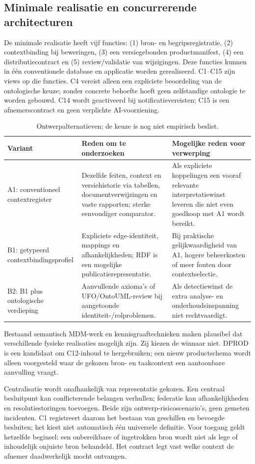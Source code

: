 \subsection{Minimale realisatie en concurrerende architecturen}
De minimale realisatie heeft vijf functies: (1) bron- en begripsregistratie, (2) contextbinding bij beweringen, (3) een versiegebonden productmanifest, (4) een distributiecontract en (5) review/validatie van wijzigingen. Deze functies kunnen in één conventionele database en applicatie worden gerealiseerd. C1--C15 zijn views op die functies. C4 vereist alleen een expliciete beoordeling van de ontologische keuze; zonder concrete behoefte hoeft geen zelfstandige ontologie te worden gebouwd. C14 wordt geactiveerd bij notificatievereisten; C15 is een afnemerscontract en geen verplichte AI-voorziening.

\begin{longtable}{@{}P{.23\linewidth}P{.34\linewidth}P{.35\linewidth}@{}}
\caption{Ontwerpalternatieven; de keuze is nog niet empirisch beslist.}\\
\toprule Variant & Reden om te onderzoeken & Mogelijke reden voor verwerping \\ \midrule
A1: conventioneel contextregister & Dezelfde feiten, context en versiehistorie via tabellen, documentverwijzingen en vaste rapporten; sterke eenvoudiger comparator. & Als expliciete koppelingen een vooraf relevante interpretatiewinst leveren die niet even goedkoop met A1 wordt bereikt. \\
B1: getypeerd contextbindingsprofiel & Expliciete edge-identiteit, mappings en afhankelijkheden; RDF is een mogelijke publicatierepresentatie. & Bij praktische gelijkwaardigheid van A1, hogere beheerkosten of meer fouten door contextselectie. \\
B2: B1 plus ontologische verdieping & Aanvullende axioma’s of UFO/OntoUML-review bij aangetoonde identiteit-/rolproblemen. & Als detectiewinst de extra analyse- en onderhoudsinspanning niet rechtvaardigt. \\
\bottomrule\end{longtable}

Bestaand semantisch MDM-werk en kennisgraaftechnieken maken plausibel dat verschillende fysieke realisaties mogelijk zijn. \citep{L18,L13} Zij kiezen de winnaar niet. DPROD is een kandidaat om C12-inhoud te hergebruiken; een nieuw productschema wordt alleen voorgesteld waar de gekozen bron- en taakcontext een aantoonbare aanvulling vraagt. \citep{S51}

Centralisatie wordt onafhankelijk van representatie gekozen. Een centraal besluitpunt kan conflicterende belangen verhullen; federatie kan afhankelijkheden en resolutiestoringen toevoegen. Beide zijn ontwerp-risicoscenario’s, geen gemeten incidenten. C1 registreert daarom het bestaan van geschillen en bevoegde besluiten; het kiest niet automatisch één universele definitie. Voor toegang geldt hetzelfde beginsel: een onbereikbare of ingetrokken bron wordt niet als lege of inhoudelijk onjuiste bron behandeld. Het contract legt vast welke context de afnemer daadwerkelijk mocht ontvangen.
